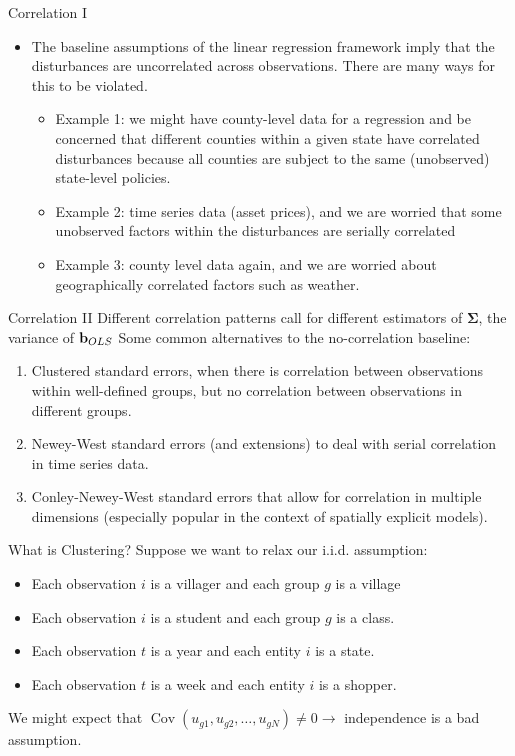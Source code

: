 \documentclass[aspectratio=169,11pt]{beamer}
\begin{document}
\begin{frame}{Correlation I}
\begin{itemize}
	\item The baseline assumptions of the linear regression framework imply that
	the disturbances are uncorrelated across observations.  There are many ways for this to be violated. 
	\begin{itemize}
		\item Example 1: we might have county-level data for a regression and be concerned
		that different counties within a given state have correlated disturbances because
		all counties are subject to the same (unobserved) state-level policies.
		\item Example 2: time series data (asset prices), and we are worried that some unobserved
		factors within the disturbances are serially correlated
		\item Example 3: county level data again, and we are worried about geographically
		correlated factors such as weather. 
	\end{itemize}
\end{itemize}
\end{frame}


\begin{frame}{Correlation II}
 Different correlation patterns call for different estimators of $\boldsymbol{\Sigma}$, the variance of ${\bf b}_{OLS}$
	Some common alternatives to the no-correlation baseline:
\begin{enumerate}
	\item Clustered standard errors, when there is correlation between observations
	within well-defined groups, but no correlation between observations in different groups. 
	\item Newey-West standard errors (and extensions) to deal with serial correlation
	in time series data.
	\item Conley-Newey-West standard errors that allow for correlation in multiple dimensions
	(especially popular in the context of spatially explicit models).
\end{enumerate}
\end{frame}


\begin{frame}{What is Clustering?}
Suppose we want to relax our i.i.d. assumption:
\begin{itemize}
\item Each observation $i$ is a \alert{villager} and each group $g$ is a \alert{village}
\item Each observation $i$ is a \alert{student} and each group $g$ is a \alert{class}.
\item Each observation $t$ is a \alert{year} and each entity $i$ is a \alert{state}.
\item Each observation $t$ is a \alert{week} and each entity $i$ is a \alert{shopper}.
\end{itemize}
We might expect that $\operatorname { Cov } (u_{g1},u_{g2},\ldots,u_{gN}) \neq 0 \rightarrow$ independence is a bad assumption. 
\end{frame}
\end{document}
